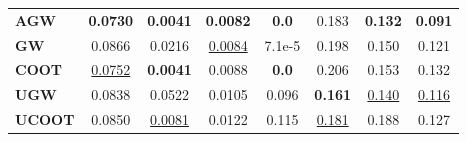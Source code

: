 \begin{table}[t]
\begin{center}
{\begin{tabular}{lccccccc}
\multicolumn{1}{l|}{\textbf{AGW}}    & \textbf{0.0730}                                                 & \textbf{0.0041}                                                & \textbf{0.0082}                                                & \textbf{0.0}                                                                   & 0.183                                                       & \textbf{0.132}                                                    & \textbf{0.091}                                                \\
\multicolumn{1}{l|}{\textbf{GW}}     & 0.0866                                                          & 0.0216                                                         & {\underline{0.0084}}                                                   & 7.1e-5                                                                         & 0.198                                                       & 0.150                                                             & 0.121                                                         \\
\multicolumn{1}{l|}{\textbf{COOT}}   & {\underline{0.0752}}                                                    & \textbf{0.0041}                                                & 0.0088                                                         & \textbf{0.0}                                                                   & 0.206                                                       & 0.153                                                             & 0.132                                                         \\
\multicolumn{1}{l|}{\textbf{UGW}}    & 0.0838                                                          & 0.0522                                                         & 0.0105                                                         & 0.096                                                                          & \textbf{0.161}                                              & {\underline{0.140}}                                                       & {\underline{0.116}}                                                   \\
\multicolumn{1}{l|}{\textbf{UCOOT}}  & 0.0850                                                          & {\underline{0.0081}}                                                   & 0.0122                                                         & 0.115                                                                          & {\underline{0.181}}                                                 & 0.188                                                             & 0.127                                                         \\

\end{tabular}}
\end{center}
\end{table}
